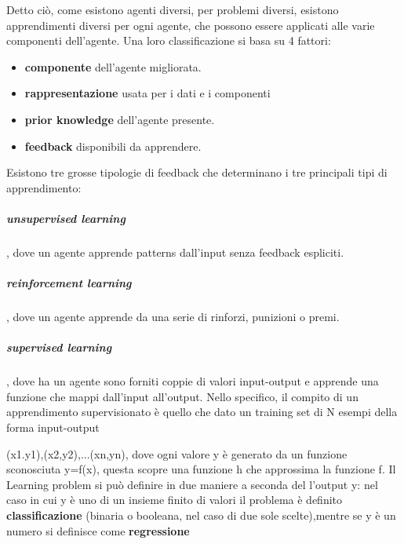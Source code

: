 \documentclass[14pt]{extarticle}
\begin{document}
\begin{itemize}
Detto ciò, come esistono agenti diversi, per problemi diversi, esistono apprendimenti diversi per ogni agente, che possono essere applicati alle varie componenti dell'agente.
Una loro classificazione si basa su 4 fattori:
\begin{itemize}
\item \textbf{componente} dell'agente migliorata.
\item \textbf{rappresentazione} usata per i dati e i componenti
\item \textbf{prior knowledge} dell'agente presente.
\item \textbf{feedback}  disponibili da apprendere. 
\end{itemize} 



Esistono tre grosse tipologie di feedback che determinano i tre principali tipi di apprendimento:
\subparagraph{unsupervised learning}, dove un agente apprende patterns dall'input senza feedback espliciti. 

\subparagraph{reinforcement learning}, dove un agente apprende da una serie di rinforzi, punizioni o premi.
\subparagraph{supervised learning}, dove ha un agente sono forniti coppie di valori input-output e apprende una funzione che mappi dall'input all'output. 
Nello specifico, il compito di un apprendimento supervisionato è quello che dato un training set di N esempi della forma input-output

(x1.y1),(x2,y2),...(xn,yn),
dove ogni valore y è generato da un funzione sconosciuta y=f(x), questa scopre una funzione h che approssima la funzione f.  
Il Learning problem si può definire in due maniere a seconda del l'output y: nel caso in cui  y è uno di  un insieme finito di valori il problema è definito  \textbf{classificazione} (binaria o booleana, nel caso di due sole scelte),mentre se y è un numero
 si definisce come \textbf{regressione}



\end{itemize}
\end{document}
